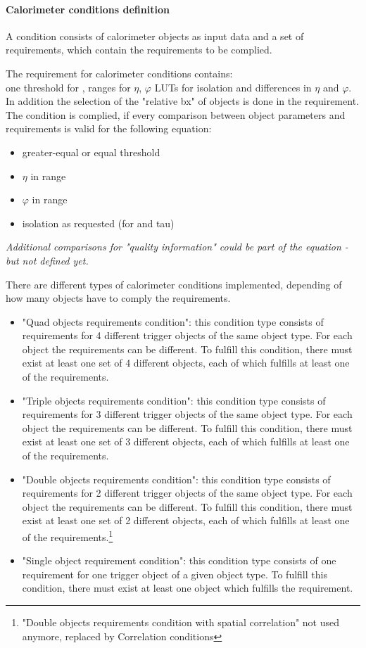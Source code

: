 \clearpage

\paragraph{Calorimeter conditions definition}\label{sec:gtl:calo_cond_def}

A condition consists of calorimeter objects as input data and a set of requirements, which contain the requirements to be complied.

The requirement for calorimeter conditions contains:\\
one threshold for \et, ranges for $\eta$, $\varphi$ LUTs for isolation and differences in $\eta$ and $\varphi$. In addition the selection of the "relative bx" of objects
is done in the requirement.\\
The condition is complied, if every comparison between object parameters and requirements is valid for the following equation:
\begin{itemize}
\item \et greater-equal or equal threshold
\item $\eta$ in range
\item $\varphi$ in range
\item isolation as requested (for \egamma and tau)
\end{itemize}
\textit{Additional comparisons for "quality information" could be part of the equation - but not defined yet.}

There are different types of calorimeter conditions implemented, depending of how many objects have to comply the requirements.
\begin{itemize}
\item "Quad objects requirements condition": this condition type consists of requirements for 4 different trigger objects of the same object type. 
For each object the requirements can be different. To fulfill this condition, there must exist at least one set of 4 different objects,
each of which fulfills at least one of the requirements.
\item "Triple objects requirements condition": this condition type consists of requirements for 3 different trigger objects of the same object type. 
For each object the requirements can be different. To fulfill this condition, there must exist at least one set of 3 different objects,
each of which fulfills at least one of the requirements.
\item "Double objects requirements condition": this condition type consists of requirements for 2 different trigger objects of the same object type. 
For each object the requirements can be different. To fulfill this condition, there must exist at least one set of 2 different objects,
each of which fulfills at least one of the requirements.\footnote{"Double objects requirements condition with spatial correlation" not used anymore, replaced by Correlation conditions}
\item "Single object requirement condition": this condition type consists of one requirement for one trigger object of a given object type. 
To fulfill this condition, there must exist at least one object which fulfills the requirement.

\end{itemize}

